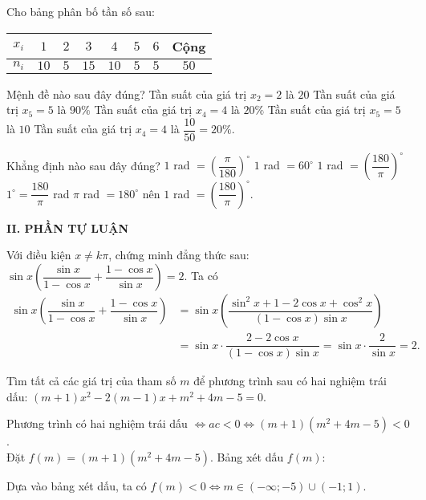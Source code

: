 \begin{ex}%
	Cho bảng phân bố tần số sau:
	\begin{center}
	\begin{tabular}{|c|c|c|c|c|c|c|c|}
		\hline
		$x_i$ & $1$ & $2$ & $3$ & $4$ & $5$ & $6$ & Cộng\\
		\hline
	$n_i$ & $10$ & $5$ & $15$ & $10$ & $5$ & $5$ & $50$\\
		\hline
	\end{tabular}
\end{center}
	Mệnh đề nào sau đây đúng?
		\choice
	{Tần suất của giá trị $x_2=2$ là $20$}
	{Tần suất của giá trị $x_5=5$ là $90\%$}
	{\True Tần suất của giá trị $x_4=4$ là $20\%$}
	{Tần suất của giá trị $x_5=5$ là $10$}
	\loigiai
{
Tần suất của giá trị $x_4=4$ là	$\dfrac{10}{50}=20\%$.
}
\end{ex}
\begin{ex}%
	Khẳng định nào sau đây đúng?
	\choice
	{$1$ rad $=\left(\dfrac{\pi}{180}\right)^\circ$}
	{$1$ rad $=60^\circ$}
	{\True $1$ rad $=\left(\dfrac{180}{\pi}\right)^\circ$}
	{$1^\circ=\dfrac{180}{\pi}$ rad}
	\loigiai
	{
	$\pi$ rad $=180^\circ$ nên $1$ rad $=\left(\dfrac{180}{\pi}\right)^\circ$.	
	}
\end{ex}
\noindent\textbf{II. PHẦN TỰ LUẬN}
\begin{bt}%
Với điều kiện $x\neq k\pi$, chứng minh đẳng thức sau: $\sin x\left(\dfrac{\sin x}{1-\cos x}+\dfrac{1-\cos x}{\sin x} \right) =2$.
\loigiai
{Ta có
$$\begin{aligned}\sin x\left(\dfrac{\sin x}{1-\cos x}+\dfrac{1-\cos x}{\sin x} \right) &=\sin x\left(\dfrac{\sin^2x+1-2\cos x+\cos^2x}{(1-\cos x)\sin x} \right)\\
&=\sin x\cdot\dfrac{2-2\cos x}{(1-\cos x)\sin x}=\sin x\cdot\dfrac{2}{\sin x}=2.
\end{aligned}$$	
}
\end{bt}
\begin{bt}%
	Tìm tất cả các giá trị của tham số $m$ để phương trình sau có hai nghiệm trái dấu: $(m+1)x^2-2(m-1)x+m^2+4m-5=0$.
	\loigiai
{
Phương trình có hai nghiệm trái dấu $\Leftrightarrow ac<0\Leftrightarrow (m+1)(m^2+4m-5)<0$.\\
Đặt $f(m)=(m+1)(m^2+4m-5)$. Bảng xét dấu $f(m)$:
\begin{center}
\end{center}
Dựa vào bảng xét dấu, ta có $f(m)<0\Leftrightarrow m\in (-\infty; -5)\cup (-1; 1)$.
}
\end{bt}
